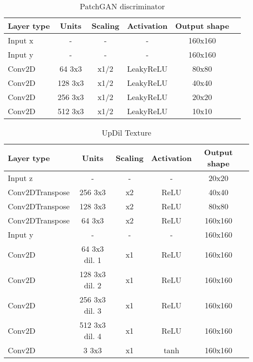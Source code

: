 \begin{table*}[h]
	\centering
	\begin{tabular}{|l|c|c|c|c|c|}
		\hline
		Layer type & Units & Scaling & Activation & Output shape\\
		\hline
		Input x & - & - & - & 160x160\\
		Input y & - & - & - & 160x160\\
		Conv2D & 64 3x3 & x1/2 & LeakyReLU & 80x80 \\
		Conv2D & 128 3x3 & x1/2 & LeakyReLU & 40x40 \\
		Conv2D & 256 3x3 & x1/2 & LeakyReLU & 20x20 \\
		Conv2D & 512 3x3 & x1/2 & LeakyReLU &  10x10\\
		\hline
	\end{tabular}
	\caption{PatchGAN discriminator}
\end{table*}


\begin{table*}[h]
	\centering
	\begin{tabular}{|l|c|c|c|c|c|}
		\hline
		Layer type & Units & Scaling & Activation & Output shape\\
		\hline
		Input z & - & - & - & 20x20 \\
		Conv2DTranspose & 256 3x3 & x2 & ReLU & 40x40 \\
		Conv2DTranspose & 128 3x3 & x2 & ReLU & 80x80 \\
		Conv2DTranspose & 64 3x3 & x2 & ReLU & 160x160 \\
		Input y & - & - & - & 160x160\\
		Conv2D & 64 3x3 dil. 1 & x1 & ReLU & 160x160 \\
		Conv2D & 128 3x3  dil. 2 & x1 & ReLU & 160x160 \\
		Conv2D & 256 3x3 dil. 3 & x1 & ReLU & 160x160 \\
		Conv2D & 512 3x3  dil. 4& x1 & ReLU & 160x160 \\
		Conv2D & 3 3x3 & x1 & tanh & 160x160 \\
		\hline
	\end{tabular}
	\caption{UpDil Texture}
\end{table*}


